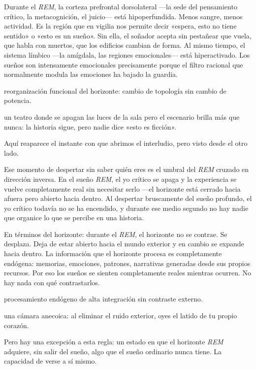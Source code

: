 Durante el \emph{REM}, la corteza prefrontal dorsolateral —la sede del pensamiento crítico, la metacognición, el juicio— está hipoperfundida. Menos sangre, menos actividad. Es la región que en vigilia nos permite decir «espera, esto no tiene sentido» o «esto es un sueño». Sin ella, el soñador acepta sin pestañear que vuela, que habla con muertos, que los edificios cambian de forma. Al mismo tiempo, el sistema límbico —la amígdala, las regiones emocionales— está hiperactivado. Los sueños son intensamente emocionales precisamente porque el filtro racional que normalmente modula las emociones ha bajado la guardia.

\begin{fisica}
 reorganización funcional del horizonte: cambio de topología sin cambio de potencia.

 un teatro donde se apagan las luces de la sala pero el escenario brilla más que nunca: la historia sigue, pero nadie dice «esto es ficción».
\end{fisica}
Aquí reaparece el instante con que abrimos el interludio, pero visto desde el otro lado.

Ese momento de despertar sin saber quién eres es el umbral del \emph{REM} cruzado en dirección inversa. En el sueño \emph{REM}, el yo crítico se apaga y la experiencia se vuelve completamente real sin necesitar serlo —el horizonte está cerrado hacia afuera pero abierto hacia dentro. Al despertar bruscamente del sueño profundo, el yo crítico todavía no se ha encendido, y durante ese medio segundo no hay nadie que organice lo que se percibe en una historia.

En términos del horizonte: durante el \emph{REM}, el horizonte no se contrae. Se desplaza. Deja de estar abierto hacia el mundo exterior y en cambio se expande hacia dentro. La información que el horizonte procesa es completamente endógena: memorias, emociones, patrones, narrativas generadas desde sus propios recursos. Por eso los sueños se sienten completamente reales mientras ocurren. No hay nada con qué contrastarlos.

\begin{fisica}
 procesamiento endógeno de alta integración sin contraste externo.

 una cámara anecoica: al eliminar el ruido exterior, oyes el latido de tu propio corazón.
\end{fisica}
\noindent Pero hay una excepción a esta regla: un estado en que el horizonte \emph{REM} adquiere, sin salir del sueño, algo que el sueño ordinario nunca tiene. La capacidad de verse a sí mismo.

